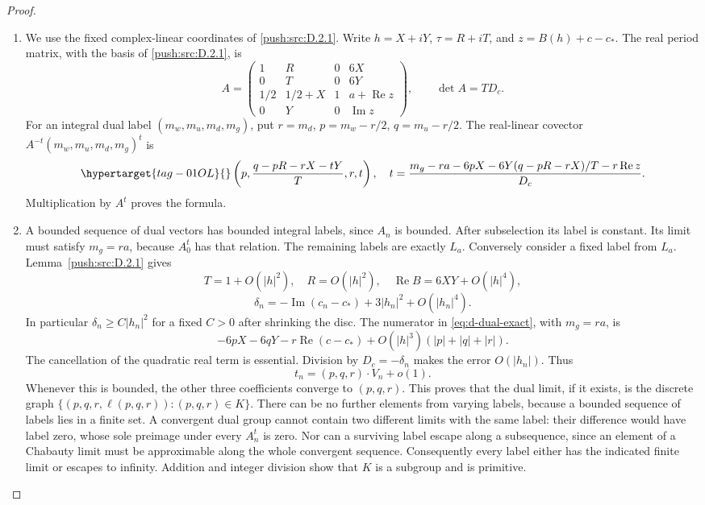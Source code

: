 \begin{proof}
\begin{enumerate}[label=\arabic*.,leftmargin=*]
\item We use the fixed complex-linear coordinates of \ref{push:src:D.2.1}. Write
\(h=X+iY\), \(\tau=R+iT\), and
\(z=B(h)+c-c_*\). The real period matrix, with the basis of \ref{push:src:D.2.1},
is
\[
 A=\begin{pmatrix}
 1&R&0&6X\\
 0&T&0&6Y\\
 1/2&1/2+X&1&a+\operatorname{Re}z\\
 0&Y&0&\operatorname{Im}z
 \end{pmatrix},\qquad
 \det A=T D_c.
\]
For an integral dual label \((m_w,m_u,m_d,m_g)\), put
\(r=m_d\), \(p=m_w-r/2\), \(q=m_u-r/2\).
The real-linear covector \(A^{-t}(m_w,m_u,m_d,m_g)^t\) is
\begin{equation}\hypertarget{tag-01OL}{}\label{eq:d-dual-exact}
 \left(p,\frac{q-pR-rX-tY}{T},r,t\right),\quad
 t=\frac{m_g-ra-6pX-6Y(q-pR-rX)/T-r\operatorname{Re}z}{D_c}.
\end{equation}
Multiplication by \(A^t\) proves the formula.

\item A bounded sequence of dual vectors has bounded integral labels,
since \(A_n\) is bounded. After subselection its label is constant.
Its limit must satisfy \(m_g=ra\), because
\(A_0^t\) has that relation. The remaining labels are exactly
\(L_a\). Conversely consider a fixed label from \(L_a\).
Lemma~\ref{push:src:D.2.1} gives
\[
 T=1+O(|h|^2),\quad R=O(|h|^2),\quad
 \operatorname{Re}B=6XY+O(|h|^4),
\]
\[
 \delta_n=-\operatorname{Im}(c_n-c_*)
                       +3|h_n|^2+O(|h_n|^4).
\]
In particular \(\delta_n\ge C|h_n|^2\) for a fixed \(C>0\)
after shrinking the disc. The numerator in
\eqref{eq:d-dual-exact}, with \(m_g=ra\), is
\[
 -6pX-6qY-r\operatorname{Re}(c-c_*)
       +O(|h|^3)(|p|+|q|+|r|).
\]
The cancellation of the quadratic real term is essential. Division
by \(D_c=-\delta_n\) makes the error \(O(|h_n|)\). Thus
\[
 t_n=(p,q,r)\cdot V_n+o(1).
\]
Whenever this is bounded, the other three coefficients converge to
\((p,q,r)\). This proves that the dual limit, if it exists, is the
discrete graph
\(\{(p,q,r,\ell(p,q,r)):(p,q,r)\in K\}\).
There can be no further elements from varying labels, because a
bounded sequence of labels lies in a finite set. A convergent dual
group cannot contain two different limits with the same label: their
difference would have label zero, whose sole preimage under every
\(A_n^t\) is zero. Nor can a surviving label escape along a
subsequence, since an element of a Chabauty limit must be approximable
along the whole convergent sequence. Consequently every label either
has the indicated finite limit or escapes to infinity. Addition and
integer division show that \(K\) is a subgroup and is primitive.


\end{enumerate}
\end{proof}
